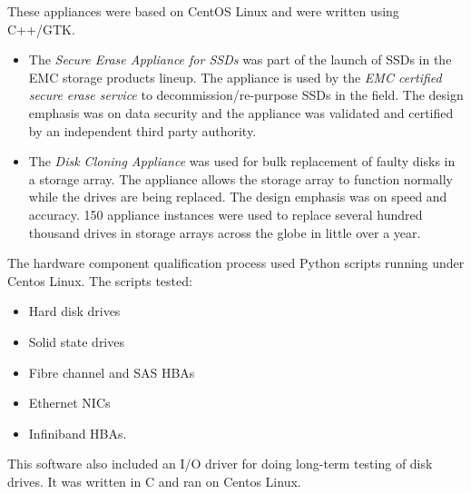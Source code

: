 \documentclass[10pt,a4paper,sans]{moderncv}
\begin{document}
                       {These appliances were based on CentOS Linux and were written using C++/GTK.
                     \begin{itemize}
                         \item The {\em Secure Erase Appliance for SSDs} was
                             part of the launch of SSDs in the EMC storage products lineup.
                             The appliance is used by the {\em EMC certified secure erase service} to
                             decommission/re-purpose SSDs in the field. The design emphasis was on
                             data security and the appliance was validated and certified by
                             an independent third party authority.
                         \item The {\em Disk Cloning Appliance} was used for bulk
                             replacement of faulty disks in a storage array. The appliance allows the
                             storage array to function normally while the drives are being replaced.
                             The design emphasis was on speed and accuracy. 150 appliance instances
                             were used to replace several hundred thousand
                             drives in storage arrays across the globe in little over a year.
                 \end{itemize}}
{The hardware component qualification process used Python scripts running under Centos Linux.
                          The scripts tested:
                          \begin{itemize}
                              \item Hard disk drives
                              \item Solid state drives
                              \item Fibre channel and SAS HBAs
                              \item Ethernet NICs
                              \item Infiniband HBAs.
                          \end{itemize}
                          This software also included an I/O driver for doing long-term testing of disk drives. It was written in C
                          and ran on Centos Linux.}

\nocite{*}


\end{document}
